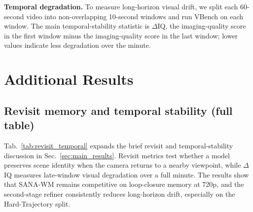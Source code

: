 \documentclass{llmxive}
\providecommand{\modelname}{SANA-WM\xspace}
\begin{document}
\noindent\textbf{Temporal degradation.}
To measure long-horizon visual drift, we split each 60-second video into non-overlapping 10-second windows and run VBench on each window.
The main temporal-stability statistic is $\Delta$IQ, the imaging-quality score in the first window minus the imaging-quality score in the last window; lower values indicate less degradation over the minute.

\section{Additional Results}
\label{sec:appendix_results}

\subsection{Revisit memory and temporal stability (full table)}
\label{sec:appendix_revisit_temporal}

Tab.~\ref{tab:revisit_temporal} expands the brief revisit and temporal-stability discussion in Sec.~\ref{sec:main_results}.
Revisit metrics test whether a model preserves scene identity when the camera returns to a nearby viewpoint, while $\Delta$IQ measures late-window visual degradation over a full minute.
The results show that \modelname remains competitive on loop-closure memory at 720p, and the second-stage refiner consistently reduces long-horizon drift, especially on the Hard-Trajectory split.
\end{document}
